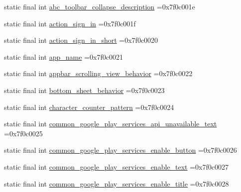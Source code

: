 \begin{DoxyCompactItemize}
\item 
static final int \mbox{\hyperlink{classbr_1_1unb_1_1cic_1_1mp_1_1marketmaster_1_1R_1_1string_ac06049c49d0ead0bce73efe6ccf2a69d}{abc\+\_\+toolbar\+\_\+collapse\+\_\+description}} =0x7f0c001e
\item 
static final int \mbox{\hyperlink{classbr_1_1unb_1_1cic_1_1mp_1_1marketmaster_1_1R_1_1string_ae8aa36c7dc71cb71ceb4f0a015e56f8c}{action\+\_\+sign\+\_\+in}} =0x7f0c001f
\item 
static final int \mbox{\hyperlink{classbr_1_1unb_1_1cic_1_1mp_1_1marketmaster_1_1R_1_1string_a36d4067d6edc880392e813fbdd04c261}{action\+\_\+sign\+\_\+in\+\_\+short}} =0x7f0c0020
\item 
static final int \mbox{\hyperlink{classbr_1_1unb_1_1cic_1_1mp_1_1marketmaster_1_1R_1_1string_a5e3a4547139509de7af5c5529a260ee2}{app\+\_\+name}} =0x7f0c0021
\item 
static final int \mbox{\hyperlink{classbr_1_1unb_1_1cic_1_1mp_1_1marketmaster_1_1R_1_1string_a26ac643c4a3642c2f539c81ff529fc03}{appbar\+\_\+scrolling\+\_\+view\+\_\+behavior}} =0x7f0c0022
\item 
static final int \mbox{\hyperlink{classbr_1_1unb_1_1cic_1_1mp_1_1marketmaster_1_1R_1_1string_aa471c2f6c37aaab36346e440a9286dec}{bottom\+\_\+sheet\+\_\+behavior}} =0x7f0c0023
\item 
static final int \mbox{\hyperlink{classbr_1_1unb_1_1cic_1_1mp_1_1marketmaster_1_1R_1_1string_aee424a42fe14b70946a67abad20bf9e9}{character\+\_\+counter\+\_\+pattern}} =0x7f0c0024
\item 
static final int \mbox{\hyperlink{classbr_1_1unb_1_1cic_1_1mp_1_1marketmaster_1_1R_1_1string_a01ea072e2f06be68e248f53667fa9448}{common\+\_\+google\+\_\+play\+\_\+services\+\_\+api\+\_\+unavailable\+\_\+text}} =0x7f0c0025
\item 
static final int \mbox{\hyperlink{classbr_1_1unb_1_1cic_1_1mp_1_1marketmaster_1_1R_1_1string_aa435bbb1d042a856c03b96f29ed60fc8}{common\+\_\+google\+\_\+play\+\_\+services\+\_\+enable\+\_\+button}} =0x7f0c0026
\item 
static final int \mbox{\hyperlink{classbr_1_1unb_1_1cic_1_1mp_1_1marketmaster_1_1R_1_1string_affe76ebfc20c89dee21508b20830e6b9}{common\+\_\+google\+\_\+play\+\_\+services\+\_\+enable\+\_\+text}} =0x7f0c0027
\item 
static final int \mbox{\hyperlink{classbr_1_1unb_1_1cic_1_1mp_1_1marketmaster_1_1R_1_1string_add43e88d7632645b788e4bb837807d3f}{common\+\_\+google\+\_\+play\+\_\+services\+\_\+enable\+\_\+title}} =0x7f0c0028
\item 

\end{DoxyCompactItemize}

